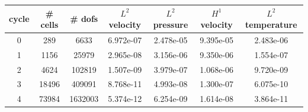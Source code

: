 \documentclass[10pt]{report}
\begin{document}
\begin{table}[H]
\begin{center}
\begin{tabular}{|c|c|c|c|c|c|c|} \hline
cycle & \# cells & \# dofs & $L^2$ velocity & $L^2$ pressure & $H^1$ velocity & $L^2$ temperature\\ \hline
0 & 289 & 6633 & 6.972e-07 & 2.478e-05 & 9.395e-05 & 2.483e-06\\ \hline
1 & 1156 & 25979 & 2.965e-08 & 3.156e-06 & 9.350e-06 & 1.554e-07\\ \hline
2 & 4624 & 102819 & 1.507e-09 & 3.979e-07 & 1.068e-06 & 9.720e-09\\ \hline
3 & 18496 & 409091 & 8.768e-11 & 4.993e-08 & 1.300e-07 & 6.075e-10\\ \hline
4 & 73984 & 1632003 & 5.374e-12 & 6.254e-09 & 1.614e-08 & 3.864e-11\\ \hline
\end{tabular}
\end{center}
\end{table}
\end{document}
